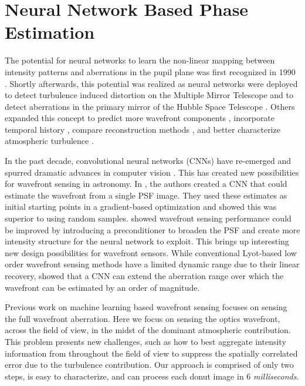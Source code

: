 \section{Neural Network Based Phase Estimation}
The potential for neural networks to learn the non-linear mapping between intensity patterns and aberrations in the pupil plane was first recognized in 1990 \cite{1990NatureMLAO}. Shortly afterwards, this potential was realized as neural networks were deployed to detect turbulence induced distortion on the Multiple Mirror Telescope \cite{1991NatureMLAO} and to detect aberrations in the primary mirror of the Hubble Space Telescope \cite{1993HubbleMLAO}. Others expanded this concept to predict more wavefront components \cite{1992SPIE.1706..113J}, incorporate temporal history \cite{1996ESOC...54...95L,1997ApOpt..36..675M}, compare reconstruction methods \cite{2006OExpr..14.6456G}, and better characterize atmospheric turbulence \cite{2008ISTSP...2..624W}. 

In the past decade, convolutional neural networks (CNNs) \cite{726791} have re-emerged and spurred dramatic advances in computer vision \cite{10.5555/2999134.2999257, 10.5555/2999792.2999897, 10.1007/s11263-015-0816-y,7780459}. This has created new possibilities for wavefront sensing in astronomy. In \cite{2018OptL...43.1235P}, the authors created a CNN that could estimate the wavefront from a single PSF image. They used these estimates as initial starting points in a gradient-based optimization and showed this was superior to using random samples. \cite{2019OExpr..27..240N} showed wavefront sensing performance could be improved by introducing a preconditioner to broaden the PSF and create more intensity structure for the neural network to exploit. This brings up interesting new design possibilities for wavefront sensors. While conventional Lyot-based low order wavefront sensing methods have a limited dynamic range due to their linear recovery, \cite{2020OExpr..2826267A} showed that a CNN can extend the aberration range over which the wavefront can be estimated by an order of magnitude.

Previous work on machine learning based wavefront sensing focuses on sensing the full wavefront aberration. Here we focus on sensing the optics wavefront, across the field of view, in the midst of the dominant atmospheric contribution. This problem presents new challenges, such as how to best aggregate intensity information from throughout the field of view to suppress the spatially correlated error due to the turbulence contribution. Our approach is comprised of only two steps, is easy to characterize, and can process each donut image in 6 \textit{milliseconds}.

